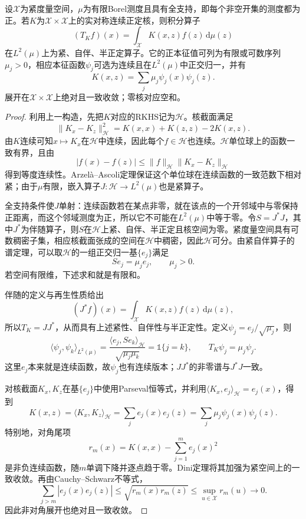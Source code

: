 \begin{theorem}[连续核的Mercer谱展开]
  \label{thm:classification-svm-mercer}
  设$\mathcal{X}$为紧度量空间，$\mu$为有限Borel测度且具有全支持，即每个非空开集的测度都为正。若$K$为$\mathcal{X}\times\mathcal{X}$上的实对称连续正定核，则积分算子
  \[
    (T_K f)(x)=\int_{\mathcal{X}}K(x,z)f(z)\,\mathrm{d}\mu(z)
  \]
  在$L^2(\mu)$上为紧、自伴、半正定算子。它的正本征值可列为有限或可数序列$\mu_j>0$，相应本征函数$\psi_j$可选为连续且在$L^2(\mu)$中正交归一，并有
  \begin{equation}
    K(x,z)=\sum_j\mu_j\psi_j(x)\psi_j(z).
    \label{eq:classification-svm-mercer-expansion}
  \end{equation}
  展开在$\mathcal{X}\times\mathcal{X}$上绝对且一致收敛；零核对应空和。
\end{theorem}
\begin{proof}
利用上一构造，先把$K$对应的RKHS记为$\mathcal{H}$。核截面满足
\[
  \lVert K_x-K_z\rVert_{\mathcal{H}}^2
  =K(x,x)+K(z,z)-2K(x,z).
\]
由$K$连续可知$x\mapsto K_x$在$\mathcal{H}$中连续，因此每个$f\in\mathcal{H}$也连续。$\mathcal{H}$单位球上的函数一致有界，且由
\[
  |f(x)-f(z)|
  \le\lVert f\rVert_{\mathcal{H}}
     \lVert K_x-K_z\rVert_{\mathcal{H}}
\]
得到等度连续性。Arzel\`a--Ascoli定理保证这个单位球在连续函数的一致范数下相对紧；由于$\mu$有限，嵌入算子$J:\mathcal{H}\to L^2(\mu)$也是紧算子。

全支持条件使$J$单射：连续函数若在某点非零，就在该点的一个开邻域中与零保持正距离，而这个邻域测度为正，所以它不可能在$L^2(\mu)$中等于零。令$S=J^{\ast}J$，其中$J^{\ast}$为伴随算子，则$S$在$\mathcal{H}$上紧、自伴、半正定且核空间为零。紧度量空间具有可数稠密子集，相应核截面张成的空间在$\mathcal{H}$中稠密，因此$\mathcal{H}$可分。由紧自伴算子的谱定理，可以取$\mathcal{H}$的一组正交归一基$\{e_j\}$满足
\[
  Se_j=\mu_j e_j,\qquad \mu_j>0.
\]
若空间有限维，下述求和就是有限和。

伴随的定义与再生性质给出
\[
  (J^{\ast}f)(x)
  =\int_{\mathcal{X}}K(x,z)f(z)\,\mathrm{d}\mu(z),
\]
所以$T_K=JJ^{\ast}$，从而具有上述紧性、自伴性与半正定性。定义$\psi_j=e_j/\sqrt{\mu_j}$，则
\[
  \langle\psi_j,\psi_k\rangle_{L^2(\mu)}
  =\frac{\langle e_j,Se_k\rangle_{\mathcal{H}}}
         {\sqrt{\mu_j\mu_k}}
  =\mathbb{1}\{j=k\},
  \qquad T_K\psi_j=\mu_j\psi_j.
\]
这里$e_j$本来就是连续函数，故$\psi_j$也有连续版本；$JJ^{\ast}$的非零谱与$J^{\ast}J$一致。

对核截面$K_x,K_z$在基$\{e_j\}$中使用Parseval恒等式，并利用$\langle K_x,e_j\rangle_{\mathcal{H}}=e_j(x)$，得到
\[
  K(x,z)
  =\langle K_x,K_z\rangle_{\mathcal{H}}
  =\sum_j e_j(x)e_j(z)
  =\sum_j\mu_j\psi_j(x)\psi_j(z).
\]
特别地，对角尾项
\[
  r_m(x)=K(x,x)-\sum_{j=1}^m e_j(x)^2
\]
是非负连续函数，随$m$单调下降并逐点趋于零。Dini定理将其加强为紧空间上的一致收敛。再由Cauchy--Schwarz不等式，
\[
  \sum_{j>m}|e_j(x)e_j(z)|
  \le\sqrt{r_m(x)r_m(z)}
  \le\sup_{u\in\mathcal{X}}r_m(u)\longrightarrow0.
\]
因此非对角展开也绝对且一致收敛。
\end{proof}

